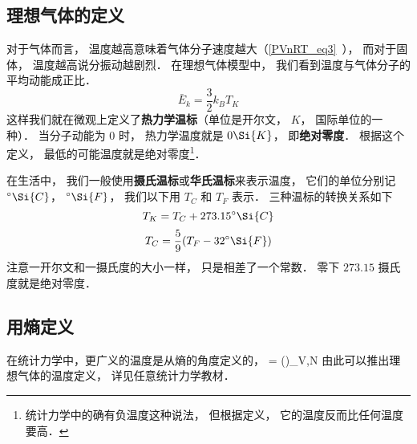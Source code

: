 

\subsection{理想气体的定义}
对于气体而言， 温度越高意味着气体分子速度越大（\autoref{PVnRT_eq3}~）， 而对于固体， 温度越高说分振动越剧烈． 在理想气体模型中， 我们看到温度与气体分子的平均动能成正比． 
\begin{equation}
\bar E_k = \frac{3}{2} k_B T_K
\end{equation}
这样我们就在微观上定义了\textbf{热力学温标}（单位是开尔文， $K$， 国际单位的一种）． 当分子动能为 0 时， 热力学温度就是 $0 \Si{K}$， 即\textbf{绝对零度}． 根据这个定义， 最低的可能温度就是绝对零度\footnote{统计力学中的确有负温度这种说法， 但根据定义， 它的温度反而比任何温度要高．}．

在生活中， 我们一般使用\textbf{摄氏温标}或\textbf{华氏温标}来表示温度， 它们的单位分别记 $^\circ\Si{C}$， $^\circ\Si{F}$， 我们以下用 $T_C$ 和 $T_F$ 表示． 三种温标的转换关系如下
\begin{equation}
T_K = T_C + 273.15^\circ\Si{C}
\end{equation}
\begin{equation}
T_C = \frac{5}{9}(T_F - 32^\circ\Si{F})
\end{equation}
注意一开尔文和一摄氏度的大小一样， 只是相差了一个常数． 零下 $273.15$ 摄氏度就是绝对零度．

\subsection{用熵定义}
在统计力学中，更广义的温度是从熵的角度定义的， 
 = \left(\right)_{V,N} 
由此可以推出理想气体的温度定义， 详见任意统计力学教材．
